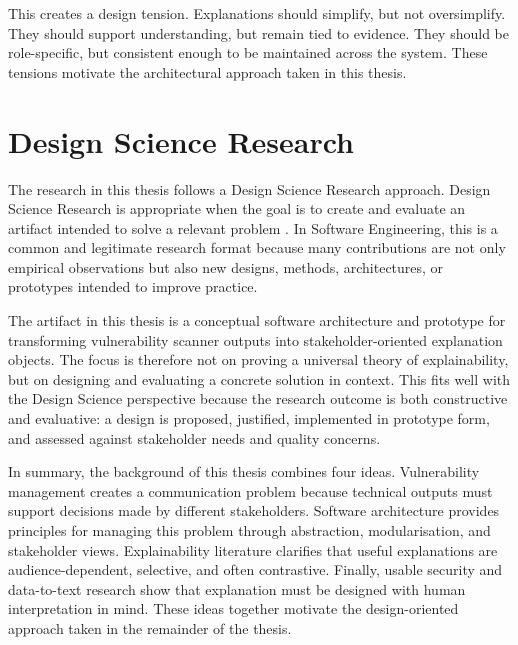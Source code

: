 This creates a design tension. Explanations should simplify, but not oversimplify. They should support understanding, but remain tied to evidence. They should be role-specific, but consistent enough to be maintained across the system. These tensions motivate the architectural approach taken in this thesis.

\section{Design Science Research}

The research in this thesis follows a Design Science Research approach. Design Science Research is appropriate when the goal is to create and evaluate an artifact intended to solve a relevant problem \cite{hevner2004dsr}. In Software Engineering, this is a common and legitimate research format because many contributions are not only empirical observations but also new designs, methods, architectures, or prototypes intended to improve practice.

The artifact in this thesis is a conceptual software architecture and prototype for transforming vulnerability scanner outputs into stakeholder-oriented explanation objects. The focus is therefore not on proving a universal theory of explainability, but on designing and evaluating a concrete solution in context. This fits well with the Design Science perspective because the research outcome is both constructive and evaluative: a design is proposed, justified, implemented in prototype form, and assessed against stakeholder needs and quality concerns.

In summary, the background of this thesis combines four ideas. Vulnerability management creates a communication problem because technical outputs must support decisions made by different stakeholders. Software architecture provides principles for managing this problem through abstraction, modularisation, and stakeholder views. Explainability literature clarifies that useful explanations are audience-dependent, selective, and often contrastive. Finally, usable security and data-to-text research show that explanation must be designed with human interpretation in mind. These ideas together motivate the design-oriented approach taken in the remainder of the thesis.